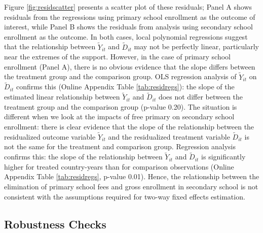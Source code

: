 \documentclass[11pt]{article}
\begin{document}
Figure \ref{fig:residscatter} presents a scatter plot of these residuals; Panel A shows residuals from the 
regressions using primary school enrollment as the outcome of interest, while Panel B shows the residuals from 
analysis using secondary school enrollment as the outcome.  
In both cases, local polynomial regressions suggest that the relationship between $\tilde{Y}_{it}$ and $\tilde{D}_{it}$ 
may not be perfectly linear, particularly near the extremes of the support.  However, in the case of primary school enrollment (Panel A), 
there is no obvious evidence that the slope differs between the 
treatment group and the comparison group.  OLS regression analysis of $\tilde{Y}_{it}$ on $\tilde{D}_{it}$ confirms 
this (Online Appendix Table \ref{tab:residregs}):  the slope of the estimated linear relationship between $\tilde{Y}_{it}$ and $\tilde{D}_{it}$ 
does not differ between the treatment group and the comparison group (p-value 0.20).  The situation is different when we look at the impacts 
of free primary on secondary school enrollment:  there is clear evidence that the slope of the relationship between the residualized 
outcome variable $\tilde{Y}_{it}$ and the residualized treatment variable $\tilde{D}_{it}$ is not the same for the treatment and comparison group.
Regression analysis confirms this:  the slope of the relationship between $\tilde{Y}_{it}$ and $\tilde{D}_{it}$ is significantly higher for treated country-years than for comparison observations (Online Appendix Table \ref{tab:residregs}, p-value 0.01).  Hence, the relationship between the elimination of 
primary school fees and gross enrollment in secondary school is not consistent with the assumptions required for two-way fixed effects estimation.


\subsection{Robustness Checks} \label{sec:robustness}

\end{document}

